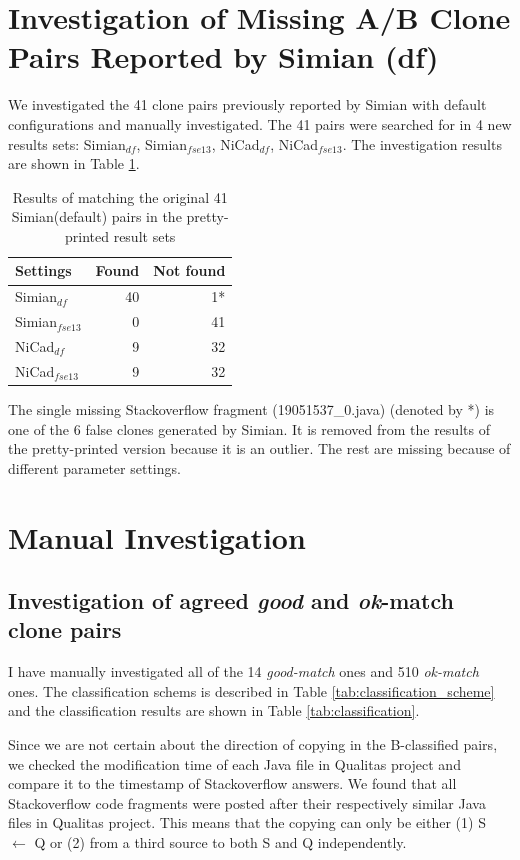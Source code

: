 \documentclass{IEEEtran}
\begin{document}
\section*{Investigation of Missing A/B Clone Pairs Reported by Simian (df)}
We investigated the 41 clone pairs previously reported by Simian with default configurations and manually investigated. The 41 pairs were searched for in 4 new results sets: Simian$_{df}$, Simian$_{fse13}$, NiCad$_{df}$, NiCad$_{fse13}$. The investigation results are shown in Table \ref{tab:search}.

\begin{table}[H]
	\centering
	\caption{Results of matching the original 41 Simian(default) pairs in the pretty-printed result sets}
	\label{tab:search}
	\begin{tabular}{l|r|r}
		\hline 
		Settings & Found & Not found \\ 
		\hline 
		Simian$_{df}$  &  40 & 1* \\ 
		\hline 
		Simian$_{fse13}$ & 0 & 41  \\ 
		\hline 
		NiCad$_{df}$  & 9 & 32 \\ 
		\hline 
		NiCad$_{fse13}$ &  9 & 32 \\ 
		\hline 
	\end{tabular} 
\end{table}

The single missing Stackoverflow fragment (19051537\_0.java) (denoted by *) is one of the 6 false clones generated by Simian. It is removed from the results of the pretty-printed version because it is an outlier. The rest are missing because of different parameter settings.


\section*{Manual Investigation}

\subsection{Investigation of agreed \textit{good} and \textit{ok}-match clone pairs}
I have manually investigated all of the 14 \textit{good-match} ones and 510 \textit{ok-match} ones. The classification schems is described in Table \ref{tab:classification_scheme} and the classification results are shown in Table \ref{tab:classification}. 

Since we are not certain about the direction of copying in the B-classified pairs, we checked the modification time of each Java file in Qualitas project and compare it to the timestamp of Stackoverflow answers. We found that all Stackoverflow code fragments were posted after their respectively similar Java files in Qualitas project. This means that the copying can only be either (1) S $\leftarrow$ Q or (2) from a third source to both S and Q independently.
\end{document}
